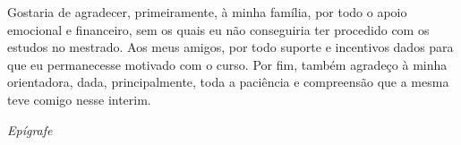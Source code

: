 \documentclass[
	12pt,				%
	openright,			%
	twoside,			%
	a4paper,			%
	openany,
	english,			%
	brazil				%
	]{abntex2}
\begin{document}
\begin{agradecimentos}
Gostaria de agradecer, primeiramente, à minha família, por todo o apoio emocional e financeiro, sem os quais eu não conseguiria ter procedido com os estudos no mestrado. Aos meus amigos, por todo suporte e incentivos dados para que eu permanecesse motivado com o curso. Por fim, também agradeço à minha orientadora, dada, principalmente, toda a paciência e compreensão que a mesma teve comigo nesse interim.

\end{agradecimentos}

\begin{epigrafe}
    \vspace*{\fill}
	\begin{flushright}
		
		\textit{Epígrafe}

	\end{flushright}
\end{epigrafe}

\end{document}

